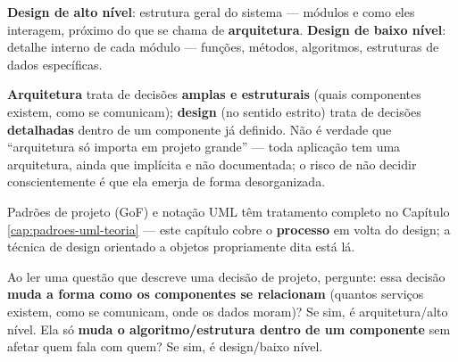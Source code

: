 \begin{conceito}
\textbf{Design de alto nível}: estrutura geral do sistema --- módulos e
como eles interagem, próximo do que se chama de \textbf{arquitetura}.
\textbf{Design de baixo nível}: detalhe interno de cada módulo --- funções,
métodos, algoritmos, estruturas de dados específicas.

\textbf{Arquitetura} trata de decisões \textbf{amplas e estruturais}
(quais componentes existem, como se comunicam); \textbf{design} (no sentido
estrito) trata de decisões \textbf{detalhadas} dentro de um componente já
definido. Não é verdade que “arquitetura só importa em projeto grande” ---
toda aplicação tem uma arquitetura, ainda que implícita e não documentada;
o risco de não decidir conscientemente é que ela emerja de forma
desorganizada.

Padrões de projeto (GoF) e notação UML têm tratamento completo no Capítulo
\ref{cap:padroes-uml-teoria} --- este capítulo cobre o \textbf{processo} em
volta do design; a técnica de design orientado a objetos propriamente dita
está lá.
\end{conceito}

\begin{regrapratica}
Ao ler uma questão que descreve uma decisão de projeto, pergunte: essa
decisão \textbf{muda a forma como os componentes se relacionam} (quantos
serviços existem, como se comunicam, onde os dados moram)? Se sim, é
arquitetura/alto nível. Ela só \textbf{muda o algoritmo/estrutura dentro de
um componente} sem afetar quem fala com quem? Se sim, é design/baixo
nível.
\end{regrapratica}
